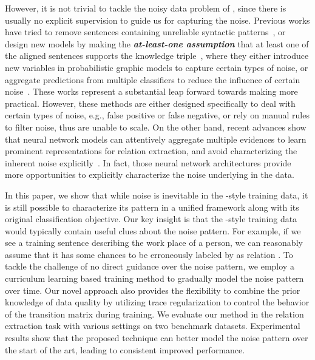 However, it is not trivial to tackle the noisy data problem of \DS, since there is usually no explicit supervision to guide us for capturing the noise.  
Previous works have tried to remove sentences containing unreliable syntactic patterns~\cite{takamatsu2012reducing},  or design new models by making the \textbf{\textit{at-least-one assumption}}  that at least one of the aligned sentences supports the knowledge triple~\cite{riedel2010modeling}, where they either introduce new variables in probabilistic graphic models to capture certain types of noise, or aggregate predictions from multiple classifiers to reduce the influence of certain noise~\cite{hoffmann2011knowledge,surdeanu2012multi,ritter2013modeling,min2013distant}. These works represent a substantial leap forward towards making \DS more practical. However, these methods are either designed specifically to deal with certain types of noise, e.g., false positive or false negative, or  rely on manual rules to filter noise, thus are unable to scale. 
On the other hand, recent advances show that neural network models can attentively aggregate multiple evidences to learn prominent representations for relation extraction, and avoid characterizing the inherent noise explicitly~\cite{zeng2015distant,lin2016neural}. In fact, those neural network architectures provide more opportunities to explicitly characterize the noise underlying in the data.    

In this paper, we show that while noise is inevitable in the \DS-style training data, it is still possible to characterize its pattern  in a unified framework along with its original classification objective. Our key insight is that the \DS-style training  data would typically contain useful clues about the noise pattern. For example, if we see a training sentence describing the work place of a person, we can reasonably assume that it has some chances to be erroneously labeled by \DS as relation  .
  To tackle the challenge of no direct guidance over the noise pattern, we employ a curriculum learning based training method to gradually model the noise pattern over time. Our novel approach also provides the flexibility to combine the prior knowledge of data quality by utilizing trace regularization to control the behavior of the transition matrix during training. 
We evaluate our method in the relation extraction task with various settings on two benchmark datasets. Experimental results show 
that  the proposed technique can better model the noise pattern over the start of the art, leading to consistent improved performance. 

